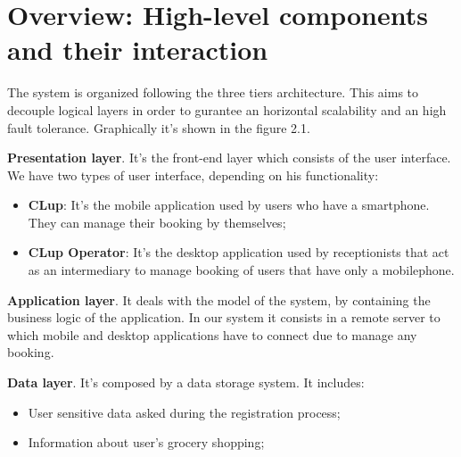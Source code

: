 

\section{Overview: High-level components and their interaction}
The system is organized following the three tiers architecture. This aims to decouple logical layers in order to gurantee an horizontal scalability and an high fault tolerance.
Graphically it's shown in the figure 2.1.
\par

\textbf{Presentation layer}. It's the front-end layer which consists of the user interface. We have two types of user interface, depending on his functionality: 
\begin{itemize}
\item \textbf{CLup}: It's the mobile application used by users who have a smartphone. They can manage their booking by themselves;
\item \textbf{CLup Operator}: It's the desktop application used by receptionists that act as an intermediary to manage booking of users that have only a mobilephone.
\end{itemize}

\textbf{Application layer}. It deals with the model of the system, by containing the business logic of the application. In our system it consists in a remote server to which mobile and desktop applications have to connect due to manage any booking.

\textbf{Data layer}. It's composed by a data storage system. It includes: 


\begin{itemize}
\item User sensitive data asked during the registration process;
\item Information about user's grocery shopping;
\end{itemize}

